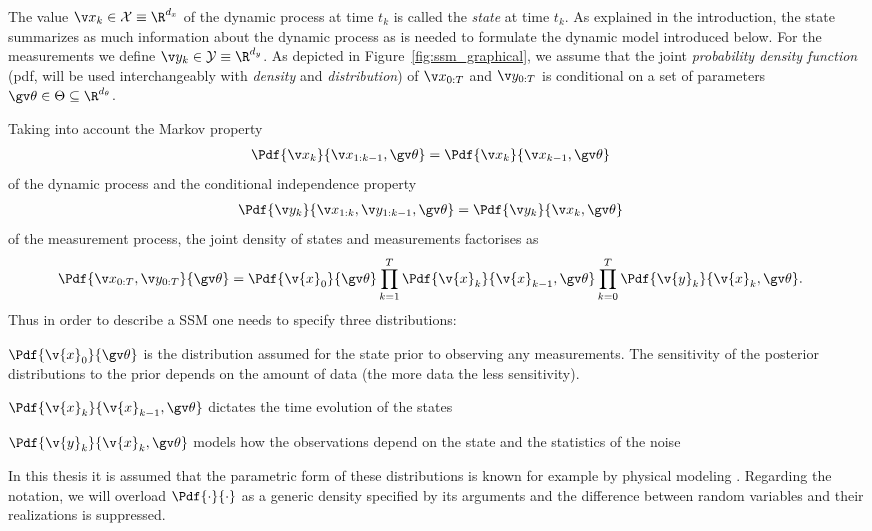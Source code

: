 The value $\xk \in \mathcal{X} \equiv \R^{d_x}$ of the dynamic process at time $t_k$ is called the
\emph{state} at time $t_k$. As explained in the introduction, the state summarizes as much information
about the dynamic process as is needed to formulate the dynamic model introduced below. 
For the measurements we define $\yk \in \mathcal{Y} \equiv \R^{d_y}$.
As depicted in Figure~\ref{fig:ssm_graphical}, we assume that the joint \emph{probability density function} 
(pdf, will be used interchangeably with \emph{density} and \emph{distribution}) of
$\X$ and $\Y$ is conditional on a set of parameters $\Th \in \Theta \subseteq \R^{d_\theta}$. 
 
Taking into account the Markov property
\begin{align}
	\Pdf{\xk}{\x_{1:k-1},\Th}&=\Pdf{\xk}{\x_{k-1},\Th}
\end{align}
of the dynamic process and the conditional
independence property 
\begin{align}
	\Pdf{\yk}{\x_{1:k},\y_{1:k-1},\Th}&=\Pdf{\yk}{\xk,\Th}
\end{align}
of the measurement process, the joint density of states
and measurements factorises as
\begin{align}
	\Pdf{\X,\Y}{\Th}&=\Pdf{\v{x}_0}{\Th}
	\prod_{k=1}^T\Pdf{\v{x}_k}{\v{x}_{k-1},\Th}
	\prod_{k=0}^T\Pdf{\v{y}_k}{\v{x}_{k},\Th}
	\label{eq:complete_data_likelihood}.
\end{align}
Thus in order to describe a SSM one needs to specify three distributions:
\begin{description}
\addtolength{\leftskip}{1cm}
	\item[Prior distribution]
	$\Pdf{\v{x}_0}{\Th}$ is the distribution assumed for the state prior to observing any measurements. The
	sensitivity of the posterior distributions to the prior depends on the amount of data (the more data the less sensitivity).
	\item[Dynamic model]
	$\Pdf{\v{x}_k}{\v{x}_{k-1},\Th}$ dictates the time evolution of the states
	\item[Measurement model]
	$\Pdf{\v{y}_k}{\v{x}_{k},\Th}$ models how the observations depend on the state and the statistics of the noise
\end{description}
In this thesis it is assumed that the parametric form of these distributions is known
for example by physical modeling \parencite{ljung1994modeling}. Regarding the notation,
we will overload $\Pdf{\cdot}{\cdot}$ as a generic density specified by its arguments and
the difference between random variables and their realizations is suppressed.

